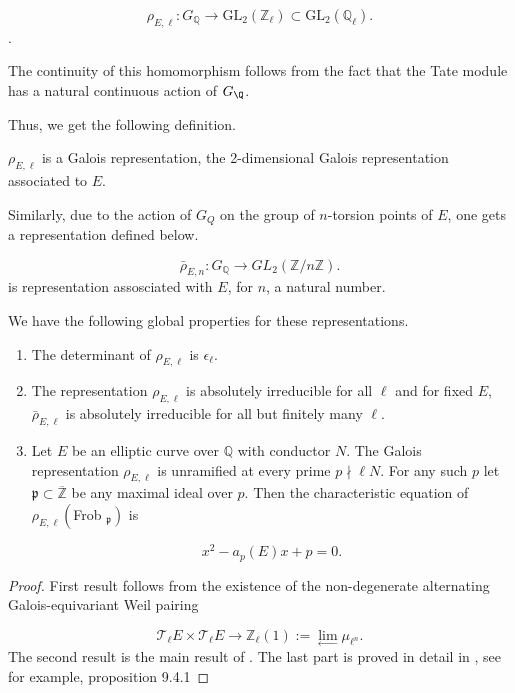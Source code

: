\[
\rho_{E, \ell}: G_{\mathbb{Q}} \longrightarrow \mathrm{GL}_{2}\left(\mathbb{Z}_{\ell}\right) \subset \mathrm{GL}_{2}\left(\mathbb{Q}_{\ell}\right).
\]. 

The continuity of this homomorphism follows from the fact that the Tate module has a natural continuous action of $G_\Q$.

Thus, we get the following definition. 

\begin{definition}
    $\rho_{E, \ell}$ is a Galois representation, the 2-dimensional Galois representation associated to $E$.
\end{definition}
Similarly, due to the action of $G_Q$ on the group of $n$-torsion points of $E$, one gets a representation defined below.

\begin{definition}
    $$
\bar{\rho}_{E, n}: G_{\mathbb{Q}} \rightarrow G L_{2}(\mathbb{Z} / n \mathbb{Z}) .
$$ is representation assosciated with $E$, for $n$, a natural number. 

\end{definition}

We have the following global properties for these representations. 

\begin{proposition}
    \begin{enumerate}
        \item The determinant of $\rho_{E, \ell}$ is $\epsilon_{\ell}$.

\item  The representation $\rho_{E, \ell}$ is absolutely irreducible for all $\ell$ and for fixed $E$, $\bar{\rho}_{E, \ell}$ is absolutely irreducible for all but finitely many $\ell$.
\item   Let $E$ be an elliptic curve over $\mathbb{Q}$ with conductor $N$. The Galois representation $\rho_{E, \ell}$ is unramified at every prime $p \nmid \ell N$. For any such $p$ let $\mathfrak{p} \subset \overline{\mathbb{Z}}$ be any maximal ideal over $p$. Then the characteristic equation of $\rho_{E, \ell}\left(\right.$Frob $\left._{\mathfrak{p}}\right)$ is

$$
x^{2}-a_{p}(E) x+p=0 .
$$

    \end{enumerate}
\end{proposition}
\begin{proof} First result follows from the existence of the non-degenerate alternating Galois-equivariant Weil pairing

$$
\mathcal{T}_{\ell} E \times \mathcal{T}_{\ell} E \longrightarrow \mathbb{Z}_{\ell}(1):=\lim _{\leftarrow} \mu_{\ell^{n}}.
$$The second result is the main result of \cite{serre1968abelian}. The last part is proved in detail in  \cite{diamond2005first}, see for example, proposition 9.4.1

    
\end{proof}

